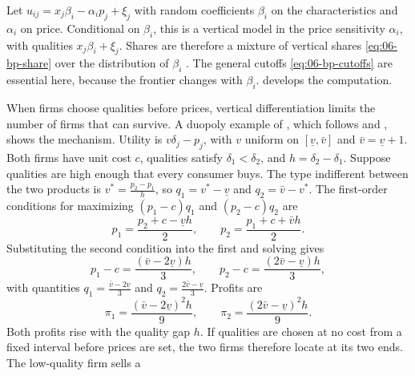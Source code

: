 \begin{remark}\label{rem:06-vext-pc}
Let $u_{ij} = x_j\beta_i - \alpha_i p_j + \xi_j$ with random coefficients $\beta_i$ on the characteristics and
$\alpha_i$ on price. Conditional on $\beta_i$, this is a vertical model in the price sensitivity $\alpha_i$,
with qualities $x_j\beta_i + \xi_j$. Shares are therefore a mixture of vertical shares
\eqref{eq:06-bp-share} over the distribution of $\beta_i$ \citep[eq.~18]{BerryPakes2007}. The general
cutoffs \eqref{eq:06-bp-cutoffs} are essential here, because the frontier changes with $\beta_i$.
 develops the computation.
\end{remark}

\begin{remark}\label{rem:06-vext-ss}
When firms choose qualities before prices, vertical differentiation limits the number of firms that can
survive. A duopoly example of \citet[sec.~7.5.1]{Tirole1988}, which follows \citet{GabszewiczThisse1979}
and \citet{ShakedSutton1982}, shows the mechanism. Utility is $v\delta_j - p_j$, with $v$ uniform on
$[\underline v, \bar v]$ and $\bar v = \underline v + 1$. Both firms have unit cost $c$, qualities satisfy
$\delta_1 < \delta_2$, and $h = \delta_2 - \delta_1$. Suppose qualities are high enough that every consumer
buys. The type indifferent between the two products is $v^* = \frac{p_2 - p_1}{h}$, so
$q_1 = v^* - \underline v$ and $q_2 = \bar v - v^*$. The first-order conditions for maximizing
$(p_1 - c)q_1$ and $(p_2 - c)q_2$ are
\begin{equation*}
  p_1 = \frac{p_2 + c - \underline v h}{2}, \qquad p_2 = \frac{p_1 + c + \bar v h}{2} .
\end{equation*}
Substituting the second condition into the first and solving gives
\begin{equation*}
  p_1 - c = \frac{(\bar v - 2\underline v)h}{3}, \qquad p_2 - c = \frac{(2\bar v - \underline v)h}{3},
\end{equation*}
with quantities $q_1 = \frac{\bar v - 2\underline v}{3}$ and $q_2 = \frac{2\bar v - \underline v}{3}$. Profits are
\begin{equation*}
  \pi_1 = \frac{(\bar v - 2\underline v)^2 h}{9}, \qquad \pi_2 = \frac{(2\bar v - \underline v)^2 h}{9} .
\end{equation*}
Both profits rise with the quality gap $h$. If qualities are chosen at no cost from a fixed interval
before prices are set, the two firms therefore locate at its two ends. The low-quality firm sells a

\end{remark}
